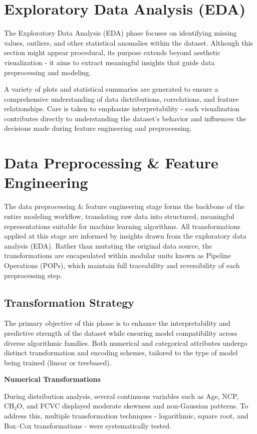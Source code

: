 \section{Exploratory Data Analysis (EDA)}\label{sec:exploratory-data-analysis}
The Exploratory Data Analysis (EDA) phase focuses on identifying missing values, outliers, and other statistical anomalies within the dataset.
Although this section might appear procedural, its purpose extends beyond aesthetic visualization - it aims to extract meaningful insights that guide data preprocessing and modeling.

A variety of plots and statistical summaries are generated to ensure a comprehensive understanding of data distributions, correlations, and feature relationships.
Care is taken to emphasize interpretability - each visualization contributes directly to understanding the dataset’s behavior and influences the decisions made during feature engineering and preprocessing.


\section{Data Preprocessing & Feature Engineering}\label{sec:data-preprocessing}
The data preprocessing & feature engineering stage forms the backbone of the entire modeling workflow, translating raw data into structured, meaningful representations suitable for machine learning algorithms.
All transformations applied at this stage are informed by insights drawn from the exploratory data analysis (EDA). Rather than mutating the original data source, the transformations are encapsulated within modular units known as Pipeline Operations (POPs), which maintain full traceability and reversibility of each preprocessing step.

\subsection{Transformation Strategy}\label{subsec:transformation-strategy}
The primary objective of this phase is to enhance the interpretability and predictive strength of the dataset while ensuring model compatibility across diverse algorithmic families.
Both numerical and categorical attributes undergo distinct transformation and encoding schemes, tailored to the type of model being trained (linear or treebased).

\textbf{Numerical Transformations}

During distribution analysis, several continuous variables such as Age, NCP, CH₂O, and FCVC displayed moderate skewness and non-Gaussian patterns.
To address this, multiple transformation techniques - logarithmic, square root, and Box–Cox transformations - were systematically tested.

